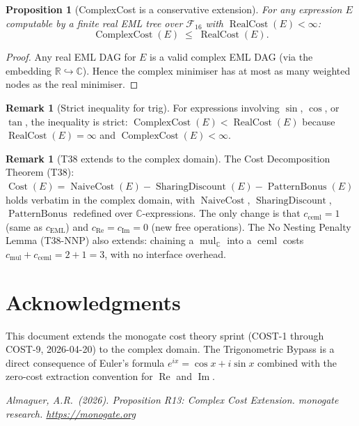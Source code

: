 \documentclass[12pt,a4paper]{article}
\newtheorem{proposition}[theorem]{Proposition}
\theoremstyle{definition}
\newtheorem{remark}[theorem]{Remark}
\newcommand{\EML}{\operatorname{EML}}
\newcommand{\ceml}{\operatorname{ceml}}
\newcommand{\Cost}{\operatorname{Cost}}
\newcommand{\RC}{\operatorname{RealCost}}
\newcommand{\CC}{\operatorname{ComplexCost}}
\newcommand{\NC}{\operatorname{NaiveCost}}
\newcommand{\SD}{\operatorname{SharingDiscount}}
\newcommand{\PB}{\operatorname{PatternBonus}}
\begin{document}
\begin{proposition}[ComplexCost is a conservative extension]
\label{prop:conservative}
For any expression $E$ computable by a finite real EML tree over
$\mathcal{F}_{16}$ with $\RC(E) < \infty$:
\[
  \CC(E) \;\leq\; \RC(E).
\]
\end{proposition}

\begin{proof}
Any real EML DAG for $E$ is a valid complex EML DAG (via the embedding
$\mathbb{R} \hookrightarrow \mathbb{C}$).
Hence the complex minimiser has at most as many weighted nodes as the real
minimiser.
\end{proof}

\begin{remark}[Strict inequality for trig]
For expressions involving $\sin$, $\cos$, or $\tan$, the inequality is strict:
$\CC(E) < \RC(E)$ because $\RC(E) = \infty$ and $\CC(E) < \infty$.
\end{remark}

\begin{remark}[T38 extends to the complex domain]
The Cost Decomposition Theorem (T38):
$\Cost(E) = \NC(E) - \SD(E) - \PB(E)$ holds verbatim in the complex domain,
with $\NC$, $\SD$, $\PB$ redefined over $\mathbb{C}$-expressions.
The only change is that $c_{\ceml} = 1$ (same as $c_{\EML}$) and
$c_{\operatorname{Re}} = c_{\operatorname{Im}} = 0$ (new free operations).
The No Nesting Penalty Lemma (T38-NNP) also extends: chaining a
$\operatorname{mul}_{\mathbb{C}}$ into a $\ceml$ costs $c_{\operatorname{mul}}
+ c_{\ceml} = 2 + 1 = 3$, with no interface overhead.
\end{remark}

\section*{Acknowledgments}

This document extends the monogate cost theory sprint (COST-1 through COST-9,
2026-04-20) to the complex domain.
The Trigonometric Bypass is a direct consequence of Euler's formula
$e^{ix} = \cos x + i\sin x$ combined with the zero-cost extraction convention
for $\operatorname{Re}$ and $\operatorname{Im}$.

\bigskip
\noindent\textit{Almaguer, A.R.\ (2026).
Proposition R13: Complex Cost Extension.
monogate research. \url{https://monogate.org}}
\end{document}
